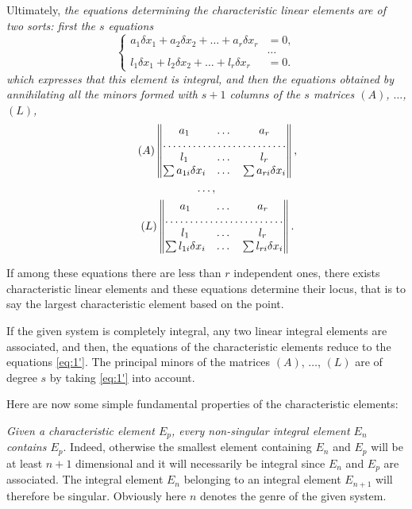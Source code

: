 \documentclass[leqno,11pt]{book}
\theoremstyle{shape1}
\theoremstyle{shapesmall}
\begin{document}
Ultimately, \emph{the equations determining the characteristic linear elements are of two sorts: first the $s$ equations}
\begin{equation}
  \tag{1$'$}\label{eq:1'}
  \left\{
    \begin{alignedat}{3}
       a_{1}\delta x_{1}+a_{2}\delta x_{2}+\dots+a_{r}\delta x_{r}&{}={}0,\\
      &\dots\\
      l_{1}\delta x_{1}+l_{2}\delta x_{2}+\dots+l_{r}\delta x_{r}&=0.
    \end{alignedat}
  \right.
\end{equation}
\emph{which expresses that this element is integral, and then the equations obtained by annihilating all the minors formed with $s+1$ columns of the $s$ matrices $(A)$, $\dots$, $(L)$,}
\begin{gather}
  \tag{$A$}
  \begin{Vmatrix}
    a_{1}&\dots&a_{r}\\
    \hdotsfor{3}\\
    l_{1}&\dots&l_{r}\\
    \sum a_{1i}\delta x_{i}&\dots&\sum a_{ri}\delta x_{i}
  \end{Vmatrix},\\
  \notag\dots,\\
  \tag{$L$}
  \begin{Vmatrix}
    a_{1}&\dots&a_{r}\\
    \hdotsfor{3}\\
    l_{1}&\dots&l_{r}\\
    \sum l_{1i}\delta x_{i}&\dots&\sum l_{ri}\delta x_{i}
  \end{Vmatrix}.  
\end{gather}

If among these equations there are less than $r$ independent ones, there exists characteristic linear elements and these equations determine their locus, that is to say the largest characteristic element based on the point.

If the given system is completely integral, any two linear integral elements are associated, and then, the equations of the characteristic elements reduce to the equations \eqref{eq:1'}. The principal minors of the matrices $(A)$, $\dots$, $(L)$ are of degree $s$ by taking \eqref{eq:1'} into account.

Here are now some simple fundamental properties of the characteristic elements:

\emph{Given a characteristic element $E_{p}$, every \emph{non-singular} integral element $E_{n}$ contains $E_{p}$}. Indeed, otherwise the smallest element containing $E_{n}$ and $E_{p}$ will be at least $n+1$ dimensional and it will necessarily be integral since $E_{n}$ and $E_{p}$ are associated. The integral element $E_{n}$ belonging to an integral element $E_{n+1}$ will therefore be singular. Obviously here $n$ denotes the genre of the given system.
\end{document}
